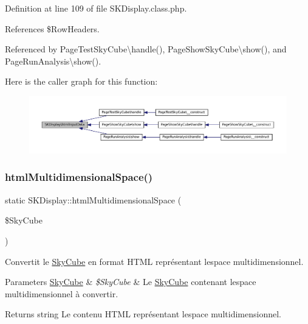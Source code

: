 Definition at line 109 of file S\+K\+Display.\+class.\+php.



References \$\+Row\+Headers.



Referenced by Page\+Test\+Sky\+Cube\textbackslash{}handle(), Page\+Show\+Sky\+Cube\textbackslash{}show(), and Page\+Run\+Analysis\textbackslash{}show().

Here is the caller graph for this function\+:\nopagebreak
\begin{figure}[H]
\begin{center}
\leavevmode
\includegraphics[width=350pt]{class_s_k_display_a747b571c4ef0f6d421fad02761eab956_icgraph}
\end{center}
\end{figure}
\mbox{\label{class_s_k_display_a9623f5a50f0b3e2cbba59d01c43c7538}} 
\subsubsection{\texorpdfstring{html\+Multidimensional\+Space()}{htmlMultidimensionalSpace()}}
{\footnotesize\ttfamily static S\+K\+Display\+::html\+Multidimensional\+Space (\begin{DoxyParamCaption}\item[{}]{\$\+Sky\+Cube }\end{DoxyParamCaption})\hspace{0.3cm}{\ttfamily [static]}}

Convertit le \hyperlink{class_sky_cube}{Sky\+Cube} en format H\+T\+ML représentant l\textquotesingle{}espace multidimensionnel.


\begin{DoxyParams}[1]{Parameters}
\hyperlink{class_sky_cube}{Sky\+Cube} & {\em \$\+Sky\+Cube} & Le \hyperlink{class_sky_cube}{Sky\+Cube} contenant l\textquotesingle{}espace multidimensionnel à convertir. \\
\hline
\end{DoxyParams}
\begin{DoxyReturn}{Returns}
string Le contenu H\+T\+ML représentant l\textquotesingle{}espace multidimensionnel. 
\end{DoxyReturn}


